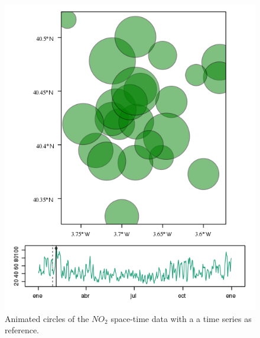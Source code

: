 \begin{figure}
  \centering
  \includegraphics[width=\textwidth]{figs/vLine.png}
  \caption{Animated circles of the $NO_2$ space-time data with a a time series as reference.}
  \label{fig:vLine}
\end{figure}
